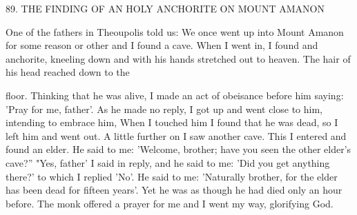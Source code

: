 89. THE FINDING OF AN HOLY ANCHORITE
ON MOUNT AMANON

One of the fathers in Theoupolis told us: We once went up into
Mount Amanon for some reason or other and I found a cave. When
I went in, I found and anchorite, kneeling down and with his hands
stretched out to heaven. The hair of his head reached down to the

floor. Thinking that he was alive, I made an act of obeisance before
him saying: 'Pray for me, father'. As he made no reply, I got up and
went close to him, intending to embrace him, When I touched him
I found that he was dead, so I left him and went out. A little further
on I saw another cave. This I entered and found an elder. He said
to me: 'Welcome, brother; have you seen the other elder's cave?”
"Yes, father' I said in reply, and he said to me: 'Did you get
anything there?' to which I replied 'No'. He said to me: 'Naturally
brother, for the elder has been dead for fifteen years'. Yet he was as
though he had died only an hour before. The monk offered a prayer
for me and I went my way, glorifying God.

